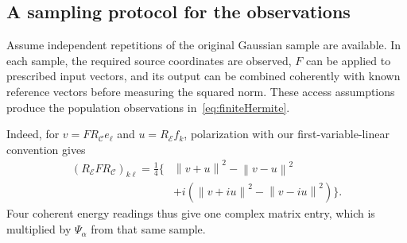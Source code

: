 \documentclass[11pt,a4paper]{amsart}
\numberwithin{equation}{section}
\theoremstyle{definition}
\theoremstyle{remark}
\newcommand{\cC}{\mathcal C}
\newcommand{\cE}{\mathcal E}
\newcommand{\norm}[1]{\left\lVert#1\right\rVert}
\begin{document}
\subsection{A sampling protocol for the observations}\label{subsec:empiricalmarks}
Assume independent repetitions of the original Gaussian sample are available. In each sample, the required source coordinates are observed, $F$ can be applied to prescribed input vectors, and its output can be combined coherently with known reference vectors before measuring the squared norm. These access assumptions produce the population observations in~\eqref{eq:finiteHermite}.

Indeed, for $v=FR_\cC e_\ell$ and $u=R_\cE f_k$, polarization with our first-variable-linear convention gives
\begin{equation}\label{eq:energy_polarization}
 \begin{split}
 (R_\cE FR_\cC)_{k\ell}=\frac14\big\{&\norm{v+u}^2-\norm{v-u}^2\\
 &+i(\norm{v+iu}^2-\norm{v-iu}^2)\big\}.
 \end{split}
\end{equation}
Four coherent energy readings thus give one complex matrix entry, which is multiplied by $\Psi_\alpha$ from that same sample.
\end{document}
